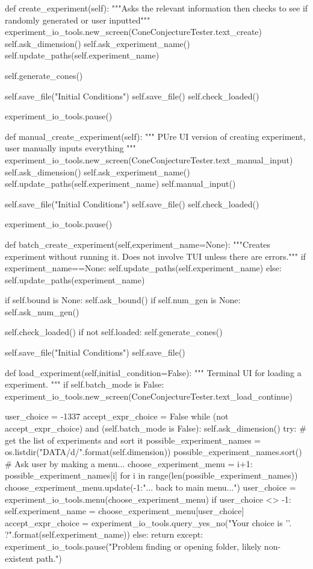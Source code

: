\documentclass{TC}
\begin{document}
\begin{SAGE}
	def create_experiment(self):
		"""Asks the relevant information then checks to see if randomly generated 
		or user inputted"""
		experiment_io_tools.new_screen(ConeConjectureTester.text_create)
		self.ask_dimension()
		self.ask_experiment_name()
		self.update_paths(self.experiment_name)
		
		self.generate_cones()
		
		self.save_file("Initial Conditions")
		self.save_file()
		self.check_loaded()

		experiment_io_tools.pause()



	def manual_create_experiment(self):
		""" PUre UI version of creating experiment, user manually inputs everything """
		experiment_io_tools.new_screen(ConeConjectureTester.text_manual_input)
		self.ask_dimension()
		self.ask_experiment_name()
		self.update_paths(self.experiment_name)
		self.manual_input()
		
		self.save_file("Initial Conditions")
		self.save_file()
		self.check_loaded()

		experiment_io_tools.pause()


	def batch_create_experiment(self,experiment_name=None):
		"""Creates experiment without running it. Does not involve TUI unless there are errors."""
		if experiment_name==None:
			self.update_paths(self.experiment_name)
		else:
			self.update_paths(experiment_name)
		
		if self.bound is None:
			self.ask_bound()
		if self.num_gen is None:
			self.ask_num_gen()

		self.check_loaded()
		if not self.loaded:
			self.generate_cones()	 
		
		self.save_file("Initial Conditions")
		self.save_file()



	def load_experiment(self,initial_condition=False):
		""" Terminal UI for loading a experiment. """
		if self.batch_mode is False:
			experiment_io_tools.new_screen(ConeConjectureTester.text_load_continue)

		user_choice = -1337 
		accept_expr_choice = False
		while (not accept_expr_choice) and (self.batch_mode is False):
			self.ask_dimension()
			try:
				# get the list of experiments and sort it
				possible_experiment_names = os.listdir("DATA/{}d/".format(self.dimension))
				possible_experiment_names.sort()
				# Ask user by making a menu...
				choose_experiment_menu = {i+1: possible_experiment_names[i] for i in range(len(possible_experiment_names)) }
				choose_experiment_menu.update({-1:"... back to main menu..."})
				user_choice = experiment_io_tools.menu(choose_experiment_menu)
				if user_choice <> -1:
					self.experiment_name = choose_experiment_menu[user_choice]
					accept_expr_choice = experiment_io_tools.query_yes_no("Your choice is '{}'. \n\tAccept?".format(self.experiment_name))
				else:
					return
			except:
				experiment_io_tools.pause("Problem finding or opening folder, likely non-existent path.")


\end{SAGE}
\end{document}
